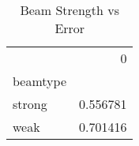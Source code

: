 \begin{table}
\caption{Beam Strength vs Error}
\begin{tabular}{lr}
 & 0 \\
beamtype &  \\
strong & 0.556781 \\
weak & 0.701416 \\
\end{tabular}
\end{table}
